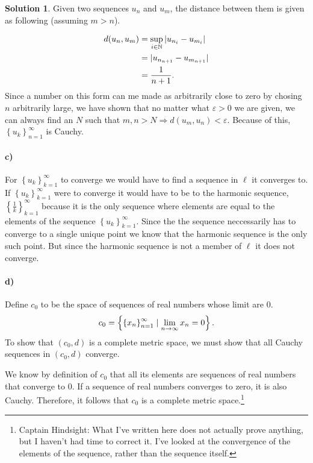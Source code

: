 \documentclass[a4paper]{article}
\theoremstyle{definition}
\newtheorem{sol}{Solution}
\begin{document}
\begin{sol}
Given two sequences $u_n$ and $u_m$, the distance between them is given as
following (assuming $m > n$).

\begin{align*}
  \notag
  d(u_n, u_m) &= \sup_{i\in\mathbb{N}}\left| u_{n_{i}} - u_{m_{i}} \right| \\ 
              &= | u_{n_{n+1}} - u_{m_{n+1}} | \\
              &= \frac{1}{n+1}.
\end{align*}
Since a number on this form can me made as arbitrarily close to zero by chosing
$n$ arbitrarily large, we have shown that no matter what $\varepsilon > 0$ we
are given, we can always find an $N$ such that $m, n > N \Longrightarrow d(u_m,
u_n) < \varepsilon$. Because of this, $\left\{ u_k \right\}_{n=1}^{\infty}$ is
Cauchy.

\paragraph{c)}

For $\left\{ u_k \right\}_{k=1}^{\infty}$ to converge we would have to find a
sequence in $\ell$ it converges to. If $\left\{ u_k \right\}_{k=1}^{\infty}$
were to converge it would have to be to the harmonic sequence, $\left\{
\frac{1}{k} \right\}_{k=1}^{\infty}$ because it is the only sequence where
elements are equal to the elements of the sequence $\left\{ u_k
\right\}_{k=1}^{\infty}$. Since the the sequence neccessarily has to converge
to a single unique point we know that the harmonic sequence is the only such
point. But since the harmonic sequence is not a member of $\ell$ it does not
converge.

\paragraph{d)}
Define $c_0$ to be the space of sequences of real numbers whose limit are 0.
\begin{equation}
  \notag
  c_{0} = \left\{ \left\{ x_n \right\}_{n=1}^{\infty} \mid \lim\limits_{n\rightarrow\infty} x_n = 0 \right\}.
\end{equation}
To show that $\left( c_0, d \right)$ is a complete metric space, we must show
that all Cauchy sequences in $\left( c_0, d \right)$ converge.

We know by definition of $c_0$ that all its elements are sequences of real
numbers that converge to $0$.  If a sequence of real numbers converges to zero,
it is also Cauchy. Therefore, it follows that $c_0$ is a complete metric
space.\footnote{Captain Hindsight: What I've written here does
not actually prove anything, but I haven't had time to correct it. I've looked at
the convergence of the elements of the sequence, rather than the sequence itself.}


\end{sol}
\end{document}
